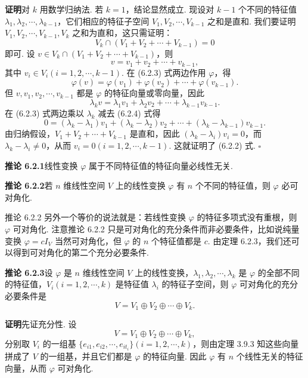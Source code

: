 \documentclass[UTF8, 12pt, fontset=fandol, oneside]{ctexart}
\begin{document}
\noindent\textbf{证明}\quad 对 $k$ 用数学归纳法. 若 $k=1$，结论显然成立. 现设对 $k-1$ 个不同的特征值 $\lambda_1,\lambda_2,\cdots,\lambda_{k-1}$，它们相应的特征子空间 $V_1,V_2,\cdots,V_{k-1}$ 之和是直和. 我们要证明 $V_1,V_2,\cdots,V_{k-1},V_k$ 之和为直和，这只需证明：
\begin{equation}
V_k\cap (V_1+V_2+\cdots+V_{k-1})=0
\tag{6.2.2}
\end{equation}
即可. 设 $v\in V_k\cap (V_1+V_2+\cdots+V_{k-1})$，则
\begin{equation}
v=v_1+v_2+\cdots+v_{k-1},
\tag{6.2.3}
\end{equation}
其中 $v_i\in V_i(i=1,2,\cdots,k-1)$. 在 (6.2.3) 式两边作用 $\varphi$，得
\[
\varphi(v)=\varphi(v_1)+\varphi(v_2)+\cdots+\varphi(v_{k-1}).
\]
但 $v,v_1,v_2,\cdots,v_{k-1}$ 都是 $\varphi$ 的特征向量或零向量，因此
\begin{equation}
\lambda_kv=\lambda_1v_1+\lambda_2v_2+\cdots+\lambda_{k-1}v_{k-1}.
\tag{6.2.4}
\end{equation}
在 (6.2.3) 式两边乘以 $\lambda_k$ 减去 (6.2.4) 式得
\[
0=(\lambda_k-\lambda_1)v_1+(\lambda_k-\lambda_2)v_2+\cdots+(\lambda_k-\lambda_{k-1})v_{k-1}.
\]
由归纳假设，$V_1+V_2+\cdots+V_{k-1}$ 是直和，因此 $(\lambda_k-\lambda_i)v_i=0$，而 $\lambda_k-\lambda_i\neq 0$，从而 $v_i=0(i=1,2,\cdots,k-1)$. 这就证明了 (6.2.2) 式. $\square$

\noindent\textbf{推论 6.2.1}\quad 线性变换 $\varphi$ 属于不同特征值的特征向量必线性无关.

\noindent\textbf{推论 6.2.2}\quad 若 $n$ 维线性空间 $V$ 上的线性变换 $\varphi$ 有 $n$ 个不同的特征值，则 $\varphi$ 必可对角化.

推论 6.2.2 另外一个等价的说法就是：若线性变换 $\varphi$ 的特征多项式没有重根，则 $\varphi$ 可对角化. 注意推论 6.2.2 只是可对角化的充分条件而非必要条件，比如说纯量变换 $\varphi=cI_V$ 当然可对角化，但 $\varphi$ 的 $n$ 个特征值都是 $c$. 由定理 6.2.3，我们还可以得到可对角化的第二个充分必要条件.

\noindent\textbf{推论 6.2.3}\quad 设 $\varphi$ 是 $n$ 维线性空间 $V$ 上的线性变换，$\lambda_1,\lambda_2,\cdots,\lambda_k$ 是 $\varphi$ 的全部不同的特征值，$V_i(i=1,2,\cdots,k)$ 是特征值 $\lambda_i$ 的特征子空间，则 $\varphi$ 可对角化的充分必要条件是
\[
V=V_1\oplus V_2\oplus\cdots\oplus V_k.
\]

\noindent\textbf{证明}\quad 先证充分性. 设
\[
V=V_1\oplus V_2\oplus\cdots\oplus V_k,
\]
分别取 $V_i$ 的一组基 $\{e_{i1},e_{i2},\cdots,e_{it_i}\}(i=1,2,\cdots,k)$，则由定理 3.9.3 知这些向量拼成了 $V$ 的一组基，并且它们都是 $\varphi$ 的特征向量. 因此 $\varphi$ 有 $n$ 个线性无关的特征向量，从而 $\varphi$ 可对角化.
\end{document}
